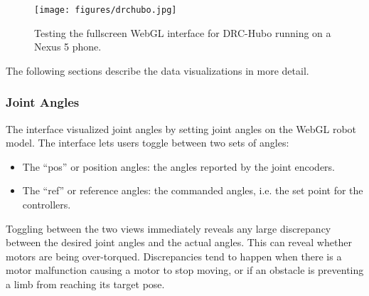 \documentclass[letterpaper, 10 pt, conference]{ieee/ieeeconf}  %
\begin{document}
\begin{figure}[thpb]
  \centering
  \texttt{[image: figures/drchubo.jpg]}
  \caption{Testing the fullscreen WebGL interface for DRC-Hubo running on a Nexus 5 phone.}
  \label{fig:DRCHubo}
\end{figure}


The following sections describe the data visualizations in more detail.

\subsubsection{Joint Angles}
The interface visualized joint angles by setting joint angles on the WebGL robot model.
The interface lets users toggle between two sets of angles:
\begin{itemize}
\item The ``pos'' or position angles: the angles reported by the joint encoders.
\item The ``ref'' or reference angles: the commanded angles, i.e. the set point for the controllers. 
\end{itemize}
Toggling between the two views immediately reveals any large discrepancy between the desired joint angles and the actual angles.
This can reveal whether motors are being over-torqued.
Discrepancies tend to happen when there is a motor malfunction causing a motor to stop moving, or if an obstacle is preventing a limb from reaching its target pose.
\end{document}
